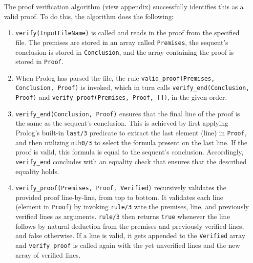 \documentclass[a4paper, 11pt]{article}
\begin{document}
   The proof verification algorithm (view appendix)
   successfully identifies this as a valid proof. To do this,
   the algorithm does the following:

   \begin{enumerate}
      \item \texttt{verify(InputFileName)} is called
            and reads in the proof from the specified file.
            The premises are stored in an array called
            \texttt{Premises}, the sequent's conclusion is
            stored in \texttt{Conclusion}, and the array
            containing the proof is stored in \texttt{Proof}.

      \item When Prolog has parsed the file, the rule
            \texttt{valid\_proof(Premises, Conclusion, Proof)}
            is invoked, which in turn calls
            \texttt{verify\_end(Conclusion, Proof)} and
            \texttt{verify\_proof(Premises, Proof, [])}, in
            the given order.

      \item \texttt{verify\_end(Conclusion, Proof)} ensures 
            that the final line of the proof is the same as
            the sequent's conclusion. This is achieved by
            first applying Prolog's built-in \texttt{last/3}
            predicate to extract the last element (line) in
            \texttt{Proof}, and then utilizing \texttt{nth0/3} 
            to select the formula present on the last line. If
            the proof is valid, this formula is equal to
            the sequent's conclusion. Accordingly, 
            \texttt{verify\_end} concludes with an equality
            check that ensures that the described equality
            holds.

      \item
         \texttt{verify\_proof(Premises, Proof, Verified)}
         recursively validates the provided proof
         line-by-line, from top to bottom. It validates each 
         line (element in \texttt{Proof}) by invoking 
         \texttt{rule/3} wite the premises, line, and 
         previously verified lines as arguments. 
         \texttt{rule/3} then returns \texttt{true} whenever 
         the line follows by natural deduction from the 
         premises and previously verified lines, and false
         otherwise. If a line is valid, it gets appended to
         the \texttt{Verified} array and \texttt{verify\_proof}
         is called again with the yet unverified lines and
         the new array of verified lines.


\end{enumerate}
\end{document}

